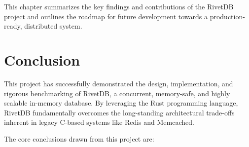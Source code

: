 
This chapter summarizes the key findings and contributions of the RivetDB project and outlines the roadmap for future development towards a production-ready, distributed system.

\section{Conclusion}

This project has successfully demonstrated the design, implementation, and rigorous benchmarking of RivetDB, a concurrent, memory-safe, and highly scalable in-memory database. By leveraging the Rust programming language, RivetDB fundamentally overcomes the long-standing architectural trade-offs inherent in legacy C-based systems like Redis and Memcached.

The core conclusions drawn from this project are:

